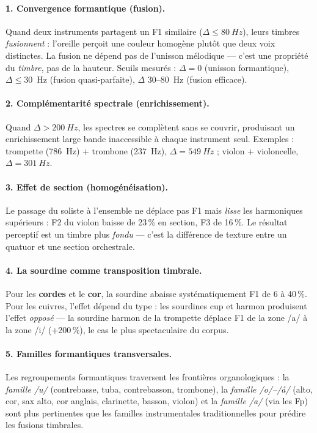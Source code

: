 \documentclass[11pt,a4paper]{article}
\begin{document}
\paragraph{1. Convergence formantique (fusion).}
Quand deux instruments partagent un F1 similaire ($\Delta \leq
\SI{80}{Hz}$), leurs timbres \emph{fusionnent} : l'oreille perçoit une
couleur homogène plutôt que deux voix distinctes. La fusion ne dépend
pas de l'unisson mélodique --- c'est une propriété du \emph{timbre}, pas
de la hauteur. Seuils mesurés : $\Delta = 0$ (unisson formantique),
$\Delta \leq 30$~Hz (fusion quasi-parfaite), $\Delta$ 30--80~Hz (fusion
efficace).

\paragraph{2. Complémentarité spectrale (enrichissement).}
Quand $\Delta > \SI{200}{Hz}$, les spectres se complètent sans se
couvrir, produisant un enrichissement large bande inaccessible à chaque
instrument seul. Exemples : trompette (\SI{786}{Hz}) + trombone
(\SI{237}{Hz}), $\Delta = \SI{549}{Hz}$ ; violon + violoncelle, $\Delta
= \SI{301}{Hz}$.

\paragraph{3. Effet de section (homogénéisation).}
Le passage du soliste à l'ensemble ne déplace pas F1 mais \emph{lisse}
les harmoniques supérieurs : F2 du violon baisse de 23\,\% en section, F3
de 16\,\%. Le résultat perceptif est un timbre plus \emph{fondu} ---
c'est la différence de texture entre un quatuor et une section
orchestrale.

\paragraph{4. La sourdine comme transposition timbrale.}
Pour les \textbf{cordes} et le \textbf{cor}, la sourdine abaisse
systématiquement F1 de 6 à 40\,\%. Pour les cuivres, l'effet dépend du
type : les sourdines cup et harmon produisent l'effet \emph{opposé} ---
la sourdine harmon de la trompette déplace F1 de la zone /a/ à la zone
/i/ (+200\,\%), le cas le plus spectaculaire du corpus.

\paragraph{5. Familles formantiques transversales.}
Les regroupements formantiques traversent les frontières organologiques :
la \emph{famille /u/} (contrebasse, tuba, contrebasson, trombone),
la \emph{famille /o/--/\r{a}/} (alto, cor, sax alto, cor anglais,
clarinette, basson, violon) et la \emph{famille /a/} (via les Fp)
sont plus pertinentes que les familles instrumentales traditionnelles
pour prédire les fusions timbrales.
\end{document}
